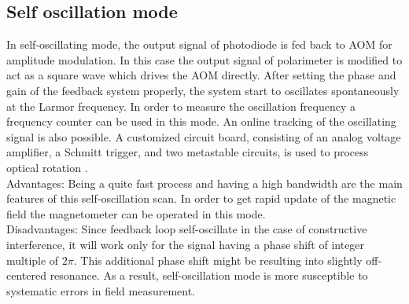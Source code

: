 \documentclass[12pt]{report}
\begin{document}
\subsection{Self oscillation mode}
In self-oscillating mode, the output signal of photodiode is  fed back to AOM for  amplitude modulation. In this case the  output signal of polarimeter is modified to act as a square wave which drives the AOM directly. After setting the phase and gain of the feedback system properly, the system start to oscillates spontaneously  at the Larmor frequency. In order to measure the oscillation frequency a frequency counter can be used in this mode. An online tracking of the oscillating signal is also possible.
 A customized circuit board, consisting of an analog voltage amplifier, a Schmitt trigger, and two metastable circuits, is used to process optical rotation \cite{PhysRevA.62.043403}.\\
Advantages: Being a quite fast process and having a high bandwidth are the main features of this self-oscillation scan. In order to get rapid update of the magnetic field the magnetometer can be operated in this mode.\\
 Disadvantages: Since feedback loop self-oscillate in the case of constructive interference, it will work only for the signal having a phase shift of integer multiple of $ 2\pi$. This additional phase shift might be resulting into slightly off-centered resonance. As a result, self-oscillation mode is more susceptible to systematic errors in field measurement.
\end{document}
